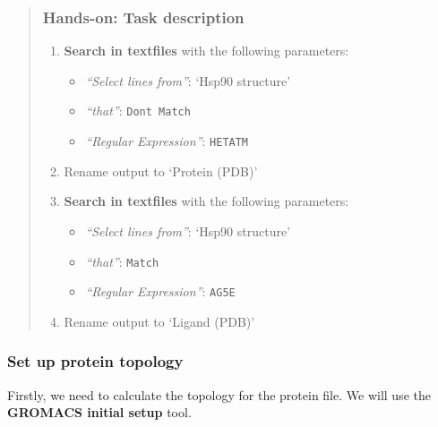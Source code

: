\documentclass[twocolumn]{bmcart}%
\providecommand{\tightlist}{%
  \setlength{\itemsep}{0pt}\setlength{\parskip}{0pt}}
\providecommand{\tightlist}{%
  \setlength{\itemsep}{0pt}\setlength{\parskip}{0pt}}
\begin{document}
\begin{quote}
\subsubsection{Hands-on: Task
description}\label{hands-on-task-description}

\begin{enumerate}
\def\labelenumi{\arabic{enumi}.}
\tightlist
\item
  \textbf{Search in textfiles} with the following parameters:
  \begin{itemize}
  \tightlist
  \item
    \emph{``Select lines from''}: `Hsp90 structure'\\
  \item
    \emph{``that''}: \texttt{Don\textquotesingle{}t\ Match}
  \item
    \emph{``Regular Expression''}: \texttt{HETATM}
  \end{itemize}
\item
  Rename output to `Protein (PDB)'
\item
  \textbf{Search in textfiles} with the following parameters:

  \begin{itemize}
  \tightlist
  \item
    \emph{``Select lines from''}: `Hsp90 structure'\\
  \item
    \emph{``that''}: \texttt{Match}
  \item
    \emph{``Regular Expression''}: \texttt{AG5E}
  \end{itemize}
\item
  Rename output to `Ligand (PDB)'
\end{enumerate}


\end{quote}

\hypertarget{set-up-protein-topology}{%
\subsubsection{Set up protein topology}\label{set-up-protein-topology}}

Firstly, we need to calculate the topology for the protein file. We will
use the \textbf{GROMACS initial setup} tool.
\end{document}
